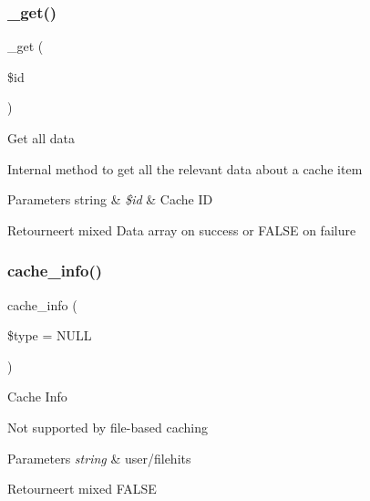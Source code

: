 \subsubsection{\texorpdfstring{\_get()}{\_get()}}
{\footnotesize\ttfamily \+\_\+get (\begin{DoxyParamCaption}\item[{}]{\$id }\end{DoxyParamCaption})\hspace{0.3cm}{\ttfamily [protected]}}

Get all data

Internal method to get all the relevant data about a cache item


\begin{DoxyParams}[1]{Parameters}
string & {\em \$id} & Cache ID \\
\hline
\end{DoxyParams}
\begin{DoxyReturn}{Retourneert}
mixed Data array on success or F\+A\+L\+SE on failure 
\end{DoxyReturn}
\mbox{\label{class_c_i___cache__file_aa8b9c4d9f0387156736ccd8850f0727e}} 
\subsubsection{\texorpdfstring{cache\_info()}{cache\_info()}}
{\footnotesize\ttfamily cache\+\_\+info (\begin{DoxyParamCaption}\item[{}]{\$type = {\ttfamily NULL} }\end{DoxyParamCaption})}

Cache Info

Not supported by file-\/based caching


\begin{DoxyParams}{Parameters}
{\em string} & user/filehits \\
\hline
\end{DoxyParams}
\begin{DoxyReturn}{Retourneert}
mixed F\+A\+L\+SE 
\end{DoxyReturn}
\mbox{\label{class_c_i___cache__file_adb40b812890a8bc058bf6b7a0e1a54d9}} 
